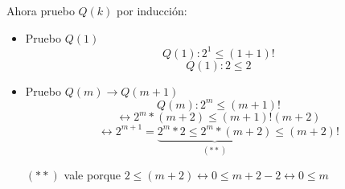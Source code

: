 \documentclass[10pt,a4paper]{article}
\begin{document}
\begin{enumerate}
\begin{itemize}
	Ahora pruebo  $Q(k)$ por inducción:
		\begin{itemize}
		\item Pruebo $Q(1)$
		$$Q(1):2^{1}\leq  (1+1)!$$
		$$Q(1):2\leq  2$$
		
		\item Pruebo $Q(m)\rightarrow Q(m+1)$
		$$Q(m):2^{m}\leq  (m+1)!$$
		$$\leftrightarrow 2^{m} *(m+2)\leq  (m+1)! (m+2)$$
		$$\leftrightarrow  2^{m+1}=\underbrace{2^{m}*2 \leq 2^{m} *(m+2)}_{(**)}\leq  (m+2)!$$
		
		$(**)$ vale porque $2 \leq (m+2)\leftrightarrow 0 \leq m +2 -2 \leftrightarrow 0 \leq m$ 
		\end{itemize}
	\end{itemize}	
	
\end{enumerate}
\end{document}
